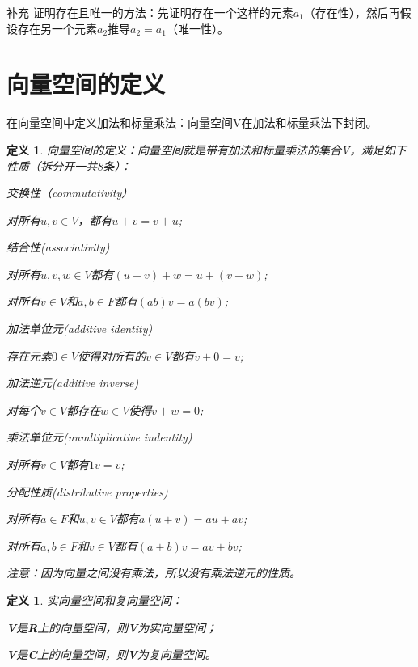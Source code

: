 \documentclass[11pt, b5paper, oneside]{book}
\newtheorem{definition}[theorem]{定义}
\begin{document}
补充 证明存在且唯一的方法：先证明存在一个这样的元素$a_1$（存在性），然后再假设存在另一个元素$a_2$推导$a_2=a_1$（唯一性）。

\section{向量空间的定义}

在向量空间中定义加法和标量乘法：向量空间V在加法和标量乘法下封闭。

\begin{definition}
    向量空间的定义：向量空间就是带有加法和标量乘法的集合V，满足如下性质（拆分开一共8条）：

    \emph{交换性（commutativity）}
    \begin{center}
        对所有$u,v \in V$，都有$u+v=v+u$;
    \end{center}
    
    \emph{结合性(associativity)}
    \begin{center}
        对所有$u,v,w \in V$都有$(u+v)+w=u+(v+w)$;

        对所有$v \in V$和$a,b \in F$都有$(ab)v=a(bv)$;
    \end{center}

    \emph{加法单位元(additive identity)}
    \begin{center}
        存在元素$0 \in V$使得对所有的$v \in V$都有$v+0=v$;
    \end{center}

    \emph{加法逆元(additive inverse)}
    \begin{center}
        对每个$v \in V$都存在$w \in V$使得$v+w=0$;
    \end{center}

    \emph{乘法单位元(numltiplicative indentity)}
    \begin{center}
        对所有$v \in V$都有$1v=v$;
    \end{center}

    \emph{分配性质(distributive properties)}
    \begin{center}
        对所有$a \in F$和$u,v \in V$都有$a(u+v)=au+av$;
        
        对所有$a,b \in F$和$v \in V$都有$(a+b)v=av+bv$;
    \end{center}

    注意：因为向量之间没有乘法，所以没有乘法逆元的性质。
\end{definition}

\begin{definition}
    实向量空间和复向量空间：

    \textbf{V}是\textbf{R}上的向量空间，则\textbf{V}为实向量空间；
    
    \textbf{V}是\textbf{C}上的向量空间，则\textbf{V}为复向量空间。
\end{definition}
\end{document}
